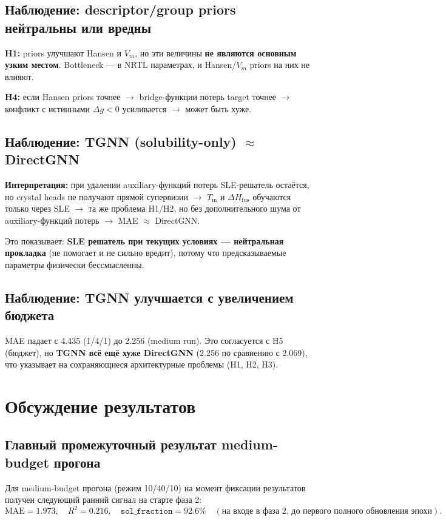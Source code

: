 \documentclass[11pt]{article}
\begin{document}
\subsection{Наблюдение: descriptor/group priors нейтральны или вредны}

\textbf{H1:} priors улучшают Hansen и $V_m$, но эти величины \textbf{не являются основным узким местом}. Bottleneck --- в NRTL параметрах, и Hansen/$V_m$ priors на них не влияют.

\textbf{H4:} если Hansen priors точнее $\to$ bridge-функции потерь target точнее $\to$ конфликт с истинными $\Delta g < 0$ усиливается $\to$ может быть хуже.

\subsection{Наблюдение: TGNN (solubility-only) $\approx$ DirectGNN}

\textbf{Интерпретация:} при удалении auxiliary-функций потерь SLE-решатель остаётся, но crystal heads не получают прямой супервизии $\to$ $T_{\mathrm{m}}$ и $\Delta H_{\mathrm{fus}}$ обучаются только через SLE $\to$ та же проблема H1/H2, но без дополнительного шума от auxiliary-функций потерь $\to$ MAE $\approx$ DirectGNN.

Это показывает: \textbf{SLE решатель при текущих условиях --- нейтральная прокладка} (не помогает и не сильно вредит), потому что предсказываемые параметры физически бессмысленны.

\subsection{Наблюдение: TGNN улучшается с увеличением бюджета}

MAE падает с 4.435 (1/4/1) до 2.256 (medium run). Это согласуется с H5 (бюджет), но \textbf{TGNN всё ещё хуже DirectGNN} (2.256 по сравнению с 2.069), что указывает на сохраняющиеся архитектурные проблемы (H1, H2, H3).

\section{Обсуждение результатов}

\subsection{Главный промежуточный результат medium-budget прогона}

Для medium-budget прогона (режим 10/40/10) на момент фиксации результатов получен следующий ранний сигнал на старте фаза 2:
\begin{equation*}
\mathrm{MAE}=1.973, \quad R^2=0.216, \quad \texttt{sol\_fraction}=92.6\% \quad (\text{на входе в фаза 2, до первого полного обновления эпохи}).
\end{equation*}
\end{document}
